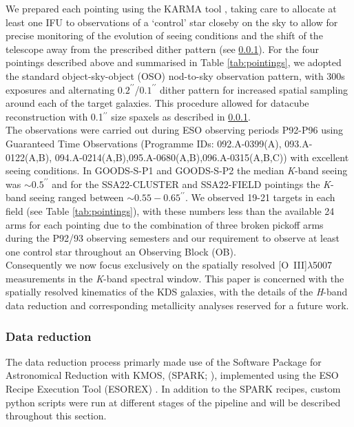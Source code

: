 \documentclass[fleqn,usenatbib]{mn2e}
\begin{document}
We prepared each pointing using the KARMA tool \citep{Wegner2008}, taking care to allocate at least one IFU to observations of a `control' star closeby on the sky to allow for precise monitoring of the evolution of seeing conditions and the shift of the telescope away from the prescribed dither pattern (see \cref{subsubsec:datareduction}).
For the four pointings described above and summarised in Table \ref{tab:pointings}, we adopted the standard object-sky-object (OSO) nod-to-sky observation pattern, with 300s exposures and alternating $0.2^{\prime\prime}$/$0.1^{\prime\prime}$ dither pattern for increased spatial sampling around each of the target galaxies.
This procedure allowed for datacube reconstruction with 0.1$^{\prime\prime}$ size spaxels as described in \cref{subsubsec:datareduction}. \\

The observations were carried out during ESO observing periods P92-P96 using Guaranteed Time Observations (Programme IDs: 092.A-0399(A), 093.A-0122(A,B), 094.A-0214(A,B),095.A-0680(A,B),096.A-0315(A,B,C)) with excellent seeing conditions.
In GOODS-S-P1 and GOODS-S-P2 the median {\it K}-band seeing was $\sim 0.5^{\prime\prime}$ and for the SSA22-CLUSTER and SSA22-FIELD pointings the {\it K}-band seeing ranged between $\sim 0.55-0.65^{\prime\prime}$.
We observed 19-21 targets in each field (see Table \ref{tab:pointings}), with these numbers less than the available 24 arms for each pointing due to the combination of three broken pickoff arms during the P92/93 observing semesters and our requirement to observe at least one control star throughout an Observing Block (OB). \\

Consequently we now focus exclusively on the spatially resolved [O~{\sc III}]$\lambda$5007 measurements in the {\it K}-band spectral window. 
This paper is concerned with the spatially resolved kinematics of the KDS galaxies, with the details of the {\it H}-band data reduction and corresponding metallicity analyses reserved for a future work.


\subsubsection{Data reduction}\label{subsubsec:datareduction}

The data reduction process primarly made use of the Software Package for Astronomical Reduction with KMOS, (SPARK; \cite{Davies2013}), implemented using the ESO Recipe Execution Tool (ESOREX) \citep{Freudling2013}.
In addition to the SPARK recipes, custom python scripts were run at different stages of the pipeline and will be described throughout this section.
\end{document}
